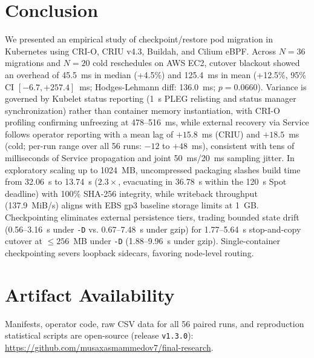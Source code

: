 \documentclass[conference,10pt]{IEEEtran}
\begin{document}
\vspace{-1.5mm}
\section{Conclusion}
We presented an empirical study of checkpoint/restore pod migration in Kubernetes using CRI-O, CRIU v4.3, Buildah, and Cilium eBPF. Across $N = 36$ migrations and $N = 20$ cold reschedules on AWS EC2, cutover blackout showed an overhead of 45.5~ms in median (+4.5\%) and 125.4~ms in mean (+12.5\%, 95\% CI $[-6.7, +257.4]$~ms; Hodges-Lehmann diff: 136.0~ms; $p = 0.0660$). Variance is governed by Kubelet status reporting (1~s PLEG relisting and status manager synchronization) rather than container memory instantiation, with CRI-O profiling confirming unfreezing at 478--516~ms, while external recovery via Service follows operator reporting with a mean lag of $+15.8$~ms (CRIU) and $+18.5$~ms (cold; per-run range over all 56 runs: $-12$ to $+48$~ms), consistent with tens of milliseconds of Service propagation and joint 50~ms/20~ms sampling jitter. In exploratory scaling up to 1024~MB, uncompressed packaging slashes build time from 32.06~s to 13.74~s ($2.3\times$, evacuating in 36.78~s within the 120~s Spot deadline) with 100\% SHA-256 integrity, while writeback throughput (137.9~MiB/s) aligns with EBS gp3 baseline storage limits at 1~GB. Checkpointing eliminates external persistence tiers, trading bounded state drift (0.56--3.16~s under \texttt{-D} vs. 0.67--7.48~s under gzip) for 1.77--5.64~s stop-and-copy cutover at $\le 256$~MB under \texttt{-D} (1.88--9.96~s under gzip). Single-container checkpointing severs loopback sidecars, favoring node-level routing.

\section*{Artifact Availability}
Manifests, operator code, raw CSV data for all 56 paired runs, and reproduction statistical scripts are open-source (release \texttt{v1.3.0}): \url{https://github.com/musaxasmammedov7/final-research}.
\end{document}
